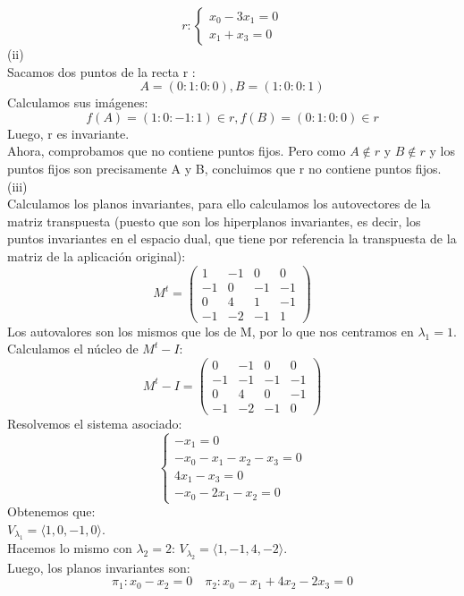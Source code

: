 {\[
r :
\begin{cases}
    x_0 - 3x_1 = 0\\
    x_1 + x_3 = 0
\end{cases}
\]
(ii)\\
Sacamos dos puntos de la recta r : \\
\[A = (0:1:0:0), B = (1:0:0:1)\] 
Calculamos sus imágenes: \\
\[f(A) = ( 1:0:-1:1)\in r, f(B) = (0:1:0:0)\in r\] 
Luego, r es invariante. \\
Ahora, comprobamos que no contiene puntos fijos. Pero como $A \notin r$ y $B \notin r$ y los puntos fijos son precisamente A y B, concluimos que r no contiene puntos fijos.\\
(iii)\\
Calculamos los planos invariantes, para ello calculamos los autovectores de la matriz transpuesta (puesto que son los hiperplanos invariantes, es decir, 
los puntos invariantes en el espacio dual, que tiene por referencia la transpuesta de la matriz de la aplicación original):
\[
M^t=
\begin{pmatrix}
    1 & -1 & 0 & 0\\
    -1 & 0 & -1 & -1 \\
    0 & 4 & 1 & -1 \\
    -1 & -2 & -1 & 1
\end{pmatrix}
\]
Los autovalores son los mismos que los de M, por lo que nos centramos en $\lambda_1 = 1$. Calculamos el núcleo de $M^t - I$:
\[
M^t - I =
\begin{pmatrix}
    0 & -1 & 0 & 0\\
    -1 & -1 & -1 & -1 \\
    0 & 4 & 0 & -1 \\
    -1 & -2 & -1 & 0
\end{pmatrix}
\]
Resolvemos el sistema asociado:
\[
\begin{cases}
    -x_1 = 0 \\
    -x_0 - x_1 - x_2 - x_3 = 0 \\
    4x_1 - x_3 = 0 \\
    -x_0 - 2x_1 - x_2 = 0
\end{cases}
\]
Obtenemos que: \\
$V_{\lambda_1} = \langle 1,0,-1,0 \rangle$. \\
Hacemos lo mismo con $\lambda_2 = 2$: $V_{\lambda_2} = \langle 1,-1,4,-2 \rangle$. \\
Luego, los planos invariantes son:\\
\[\pi_1 : x_0 - x_2 = 0 \quad
\pi_2 : x_0 - x_1 + 4x_2 - 2x_3 = 0
\]


}
